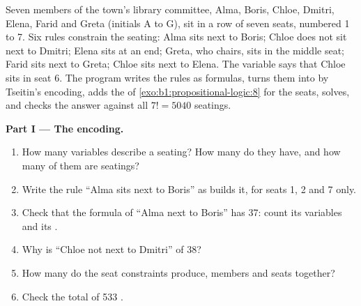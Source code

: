 \begin{problem}\label{pb:b1:propositional-logic:1}
Seven members of the town's library committee, Alma, Boris, Chloe, Dmitri, Elena, Farid and Greta (initials A to G),
sit in a row of seven seats, numbered 1 to 7. Six rules constrain the seating: Alma sits next to Boris; Chloe does not
sit next to Dmitri; Elena sits at an end; Greta, who chairs, sits in the middle seat; Farid sits next to Greta; Chloe
sits next to Elena. The variable  says that Chloe sits in seat 6. The program writes the rules as formulas,
turns them into  by Tseitin's encoding, adds the  of \cref{exo:b1:propositional-logic:8} for the seats,
solves, and checks the answer against all $7! = 5040$ seatings.
\label{lst:b1:propositional-logic:tseitin}
\label{lst:b1:propositional-logic:committee}
\label{out:b1:propositional-logic:committee}

\medskip\noindent\textbf{Part I --- The encoding.}
\begin{enumerate}
\item How many variables describe a seating? How many  do they have, and how many of them are seatings?
\item Write the rule ``Alma sits next to Boris'' as  builds it, for seats 1, 2 and 7 only.
\item Check that the formula of ``Alma next to Boris'' has  37: count its variables and its .
\item Why is ``Chloe not next to Dmitri'' of  38?
\item How many  do the seat constraints produce, members and seats together?
\item Check the total of 533 .
\end{enumerate}


\end{problem}
